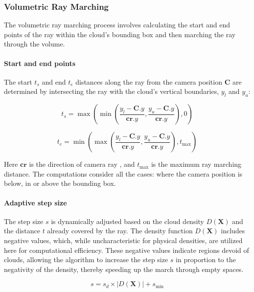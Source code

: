 \subsubsection{Volumetric Ray Marching}

The volumetric ray marching process involves calculating the start and end points of the ray within the cloud's bounding box and then marching the ray through the volume.

\paragraph{Start and end points}

The start $t_s$ and end $t_e$ distances along the ray from the camera position $\mathbf{C}$ are determined by intersecting the ray with the cloud's vertical boundaries, $y_l$ and $y_u$: 

\begin{equation}
    t_s = \max(\min(\frac{y_l - \mathbf{C}.y}{\mathbf{cr}.y}, \frac{y_u - \mathbf{C}.y}{\mathbf{cr}.y}), 0)
\end{equation}

\begin{equation}
    t_e = \min(\max(\frac{y_l - \mathbf{C}.y}{\mathbf{cr}.y}, \frac{y_u - \mathbf{C}.y}{\mathbf{cr}.y}), t_{\text{max}})
\end{equation}

Here $\mathbf{cr}$ is the direction of camera ray , and $t_{\text{max}}$ is the maximum ray marching distance. The computations consider all the cases: where the camera position is below, in or above the bounding box.

\paragraph{Adaptive step size}

The step size $s$ is dynamically adjusted based on the cloud density $D(\mathbf{X})$ and the distance $t$ already covered by the ray. The density function $D(\mathbf{X})$ includes negative values, which, while uncharacteristic for physical densities, are utilized here for computational efficiency. These negative values indicate regions devoid of clouds, allowing the algorithm to increase the step size $s$ in proportion to the negativity of the density, thereby speeding up the march through empty spaces.

\begin{equation}
    s = s_d \times |D(\mathbf{X})| + s_{\text{min}}
\end{equation}

